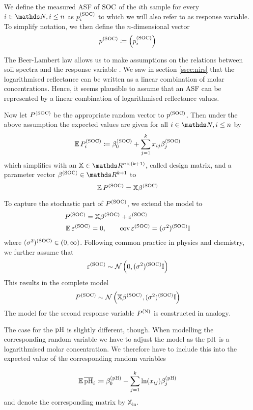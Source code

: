 	
		We define the measured ASF of $\mathrm{SOC}$ of the $i$th sample for every $i\in\SN,i\leq n$ as $p^{\mathrm{(SOC)}}_i$ to which we will also refer to as response variable.
		To simplify notation, we then define the $n$-dimensional vector
		\[
			p^{\mathrm{(SOC)}} \coloneqq \left( p^{\mathrm{(SOC)}}_i \right)
		\]

		The Beer-Lambert law allows us to make assumptions on the relations between soil spectra and the response variable \cite[247-8, 254]{agelet:10a}.
		We saw in section \ref{ssec:nirs} that the logarithmised reflectance can be written as a linear combination of molar concentrations.
		Hence, it seems plausible to assume that an ASF can be represented by a linear combination of logarithmised reflectance values.

		Now let $P^{\mathrm{(SOC)}}$ be the appropriate random vector to $p^{\mathrm{(SOC)}}$.
		Then under the above assumption the expected values are given for all $i \in \SN, i \leq n$ by
		\[
			\operatorname{\mathbb{E}} P_i^{\mathrm{(SOC)}} \coloneqq \beta^{\mathrm{(SOC)}}_0 + \sum_{j = 1}^k{x_{ij}\beta^{\mathrm{(SOC)}}_j} 
		\]
		which simplifies with an $\mathbb{X} \in \SR^{n \times (k+1)}$, called design matrix, and a parameter vector $\beta^\m{(SOC)} \in \SR^{k+1}$ to
		\[
			\operatorname{\mathbb{E}} P^{\mathrm{(SOC)}} = \mathbb{X}\beta^{\mathrm{(SOC)}}
		\]
		
		To capture the stochastic part of $P^{\mathrm{(SOC)}}$, we extend the model to
		\begin{alignat*}{3}
			&P^{\mathrm{(SOC)}} = \mathbb{X}\beta^{\mathrm{(SOC)}} + \varepsilon^{\mathrm{(SOC)}} \\
			&\operatorname{\mathbb{E}} \varepsilon^{\mathrm{(SOC)}} = 0, \qquad \operatorname{cov} \varepsilon^{\mathrm{(SOC)}} = (\sigma^2)^{\mathrm{(SOC)}} \mathrm{I}
		\end{alignat*}
		where $(\sigma^2)^{\mathrm{(SOC)}} \in (0,\infty)$. Following common practice in physics and chemistry, we further assume that 
		\[
			\varepsilon^{\mathrm{(SOC)}} \sim \mathcal{N} \left( 0,(\sigma^2)^{\mathrm{(SOC)}}\mathrm{I} \right)
		\]
		This results in the complete model
		\[
			P^{\mathrm{(SOC)}} \sim \mathcal{N} \left( \mathbb{X}\beta^{\mathrm{(SOC)}},(\sigma^2)^{\mathrm{(SOC)}} \mathrm{I} \right)
		\]
		The model for the second response variable $P^{\mathrm{(N)}}$ is constructed in analogy.
		
		The case for the $\mathrm{pH}$ is slightly different, though. 
		When modelling the corresponding random variable we have to adjust the model as the $\mathrm{pH}$ is a logarithmised molar concentration.
		We therefore have to include this into the expected value of the corresponding random variables
		
		\[
			\operatorname{\mathbb{E}} \mathrm{\overline{pH}}_i \coloneqq \beta^{\mathrm{\mathrm{(pH)}}}_0 + \sum_{j = 1}^k{\ln (x_{ij}) \beta^{\mathrm{(pH)}}_j} 
		\]
		and denote the corresponding matrix by $\mathbb{X}_{\ln}$.

